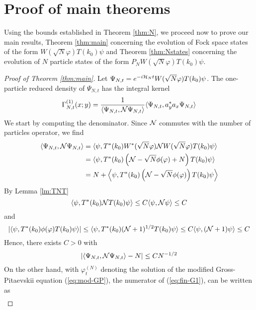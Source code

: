 \documentclass[11pt,a4paper,DIV11]{scrartcl}	%
\newcommand{\cH}{{\cal H}}
\newcommand{\cN}{{\cal N}}
\begin{document}
\section{Proof of main theorems}

Using the bounds established in Theorem \ref{thm:N}, we proceed now to prove our main results, Theorem \ref{thm:main} concerning the evolution of Fock space states of the form $W(\sqrt{N} \varphi) T(k_0) \psi$ and Theorem \ref{thm:Nstates} concerning the evolution of $N$ particle states of the form $P_N W(\sqrt{N} \varphi) T(k_0) \psi$. 

\begin{proof}[Proof of Theorem \ref{thm:main}]
Let $\Psi_{N,t} = e^{-i\cH_N t} W(\sqrt{N} \varphi) T(k_0) \psi$. The one-particle reduced density of $\Psi_{N,t}$ has the integral kernel
\begin{equation}\label{eq:fin-G1} \Gamma_{N,t}^{(1)} (x;y) = \frac{1}{\langle \Psi_{N,t} , \cN \Psi_{N,t} \rangle} \langle \Psi_{N,t} , a_y^* a_x \Psi_{N,t} \rangle \end{equation}
We start by computing the denominator. Since $\cN$ commutes with the number of particles operator, we find
\[ \begin{split} 
\langle \Psi_{N,t} , \cN \Psi_{N,t} \rangle = \; &\langle \psi,T^* (k_0) W^* (\sqrt{N} \varphi) \cN W (\sqrt{N} \varphi)  T(k_0) \psi\rangle  \\ = \; &\langle \psi, T^* (k_0) \left( \cN - \sqrt{N} \phi (\varphi) + N \right) T(k_0) \psi \rangle \\ = \; &N + \left\langle \psi,  T^* (k_0) \left(\cN - \sqrt{N} \phi(\varphi) \right) T(k_0) \psi \right\rangle\end{split} \]
By Lemma \ref{lm:TNT}
\[  \langle \psi , T^* (k_0) \cN T(k_0) \psi \rangle \leq C \langle \psi , \cN \psi \rangle \leq C \]
and 
\[ \left| \langle \psi , T^*(k_0) \phi (\varphi) T(k_0) \psi \rangle \right| \leq \langle \psi, T^* (k_0) (\cN+1)^{1/2} T(k_0) \psi \rangle \leq C \langle \psi , (\cN+1) \psi \rangle \leq C \]
Hence, there exists $C>0$ with
\begin{equation}\label{eq:fin-G2} \left| \langle \Psi_{N,t} , \cN \Psi_{N,t} \rangle - N \right| \leq C N^{-1/2} \end{equation}
On the other hand, with $\varphi^{(N)}_t$ denoting the solution of the modified Gross-Pitaevskii equation (\ref{eq:mod-GP}), the numerator of (\ref{eq:fin-G1}), can be written as  
\[ \begin{split} 

\end{split}\]
\end{proof}
\end{document}
